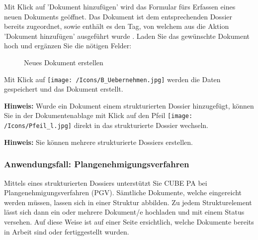 \vspace{\baselineskip}

Mit Klick auf 'Dokument hinzufügen' wird das Formular fürs Erfassen eines neuen Dokuments geöffnet. Das Dokument ist dem entsprechenden Dossier  bereits zugeordnet, sowie enthält es den Tag, von welchem aus die Aktion 'Dokument hinzufügen' ausgeführt wurde . Laden Sie das gewünschte Dokument hoch  und ergänzen Sie die nötigen Felder:

\begin{figure}[H]
  \vspace{-15pt}
  \vspace{-5pt}
\caption{Neues Dokument erstellen}
\end{figure}

Mit Klick auf \texttt{[image: /Icons/B\_Uebernehmen.jpg]} werden die Daten gespeichert und das Dokument erstellt.

\vspace{\baselineskip}

\textbf{Hinweis:} Wurde ein Dokument einem strukturierten Dossier hinzugefügt, können Sie in der Dokumentenablage mit Klick auf den Pfeil \texttt{[image: /Icons/Pfeil\_l.jpg]} direkt in das strukturierte Dossier wechseln.

\vspace{\baselineskip}

\textbf{Hinweis:} Sie können mehrere strukturierte Dossiers erstellen.

\subsubsection{Anwendungsfall: Plangenehmigungsverfahren}

Mittels eines strukturierten Dossiers unterstützt Sie CUBE PA bei Plangenehmigungsverfahren (PGV). Sämtliche Dokumente, welche eingereicht werden müssen, lassen sich in einer Struktur abbilden. Zu jedem Strukturelement lässt sich dann ein oder mehrere Dokument/e hochladen und mit einem Status versehen. Auf diese Weise ist auf einer Seite ersichtlich, welche Dokumente bereits in Arbeit sind oder fertiggestellt wurden.

